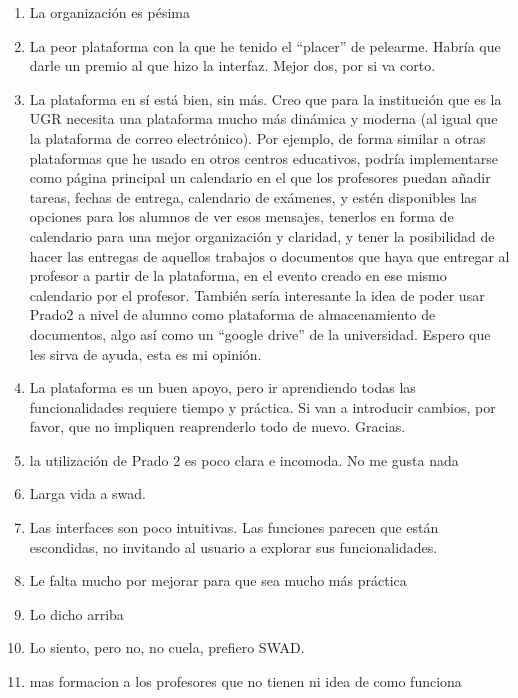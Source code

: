\begin{enumerate}
\item La organización es pésima
\item La peor plataforma con la que he tenido el ``placer'' de pelearme. Habría que darle un premio al que hizo la interfaz. Mejor dos, por si va corto.
\item La plataforma en sí está bien, sin más. Creo que para la institución que es la UGR necesita una plataforma mucho más dinámica y moderna (al igual que la plataforma de correo electrónico). Por ejemplo, de forma similar a otras plataformas que he usado en otros centros educativos, podría implementarse como página principal un calendario en el que los profesores puedan añadir tareas, fechas de entrega, calendario de exámenes, y estén disponibles las opciones para los alumnos de ver esos mensajes, tenerlos en forma de calendario para una mejor organización y claridad, y tener la posibilidad de hacer las entregas de aquellos trabajos o documentos que haya que entregar al profesor a partir de la plataforma, en el evento creado en ese mismo calendario por el profesor. También sería interesante la idea de poder usar Prado2 a nivel de alumno como plataforma de almacenamiento de documentos, algo así como un ``google drive'' de la universidad. Espero que les sirva de ayuda, esta es mi opinión.
\item La plataforma es un buen apoyo, pero ir aprendiendo todas las funcionalidades requiere tiempo y práctica. Si van a introducir cambios, por favor, que no impliquen reaprenderlo todo de nuevo. Gracias.
\item la utilización de Prado 2 es poco clara e incomoda. No me gusta nada
\item Larga vida a swad.
\item Las interfaces son poco intuitivas. Las funciones parecen que están escondidas, no invitando al usuario a explorar sus funcionalidades.
\item Le falta mucho por mejorar para que sea mucho más práctica
\item Lo dicho arriba
\item Lo siento, pero no, no cuela, prefiero SWAD.
\item mas formacion a los profesores que no tienen ni idea de como funciona

\end{enumerate}
